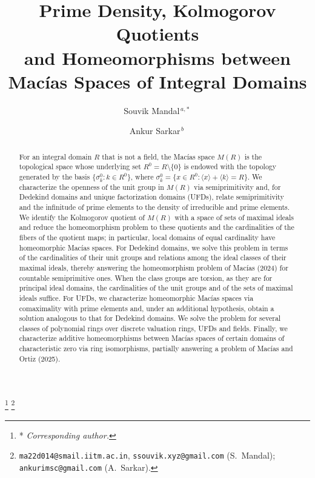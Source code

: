\documentclass[12pt,reqno,a4paper]{amsart}
\newcommand{\orcid}[1]{\,{\large\orcidlink{#1}}}
\theoremstyle{plain}
\theoremstyle{definition}
\begin{document}
\title[Prime Density and Homeomorphisms between Mac\'ias Spaces]{Prime Density, Kolmogorov Quotients\\ and Homeomorphisms between\\ Mac\'ias Spaces of Integral Domains}
\author[S. Mandal]{{Souvik Mandal$^{\,a,*}$}\orcid{0009-0004-0429-3063}}
\author[A. Sarkar]{{Ankur Sarkar$^{\,b}$}\orcid{0009-0002-3320-2568}}
\thanks{\hspace{-1.1em}* \textit{Corresponding author.}}
\thanks{%
  \parbox[t]{\dimexpr\textwidth-10em\relax}{\texttt{ma22d014@smail.iitm.ac.in}, \texttt{ssouvik.xyz@gmail.com} (S.~Mandal);\\
  \texttt{ankurimsc@gmail.com} (A.~Sarkar).} }
\begin{abstract}
For an integral domain $R$ that is not a field, the Mac\'ias space $M(R)$ is the topological space whose underlying set $R^0=R\setminus\{0\}$ is endowed with the topology generated by the basis $\{\sigma_k^0:k\in R^0\}$, where $\sigma_k^0=\{x\in R^0:\langle x\rangle+\langle k\rangle=R\}$. We characterize the openness of the unit group in $M(R)$ via semiprimitivity and, for Dedekind domains and unique factorization domains (UFDs), relate semiprimitivity and the infinitude of prime elements to the density of irreducible and prime elements. We identify the Kolmogorov quotient of $M(R)$ with a space of sets of maximal ideals and reduce the homeomorphism problem to these quotients and the cardinalities of the fibers of the quotient maps; in particular, local domains of equal cardinality have homeomorphic Mac\'ias spaces. For Dedekind domains, we solve this problem in terms of the cardinalities of their unit groups and relations among the ideal classes of their maximal ideals, thereby answering the homeomorphism problem of Mac\'ias (2024) for countable semiprimitive ones. When the class groups are torsion, as they are for principal ideal domains, the cardinalities of the unit groups and of the sets of maximal ideals suffice. For UFDs, we characterize homeomorphic Mac\'ias spaces via comaximality with prime elements and, under an additional hypothesis, obtain a solution analogous to that for Dedekind domains. We solve the problem for several classes of polynomial rings over discrete valuation rings, UFDs and fields. Finally, we characterize additive homeomorphisms between Mac\'ias spaces of certain domains of characteristic zero via ring isomorphisms, partially answering a problem of Mac\'ias and Ortiz (2025).
\end{abstract}
\end{document}

